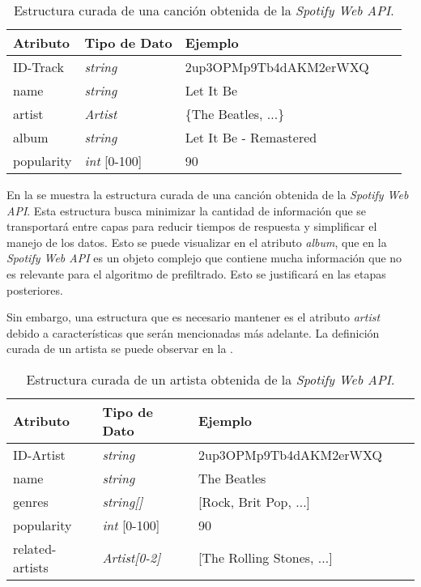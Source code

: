 \begin{table}[h!]
\centering
\begin{tabular}{l l l l l}
\toprule
Atributo & Tipo de Dato & Ejemplo \\
\midrule
ID-Track & \textit{string} & 2up3OPMp9Tb4dAKM2erWXQ \\
name & \textit{string} & Let It Be \\
artist & \textit{Artist} & \{The Beatles, ...\} \\
album & \textit{string} & Let It Be - Remastered \\
popularity & \textit{int} [0-100] & 90 \\

\bottomrule
\end{tabular}
\caption{Estructura curada de una canción obtenida de la \textit{Spotify Web API}.}
\label{tab:canciones_api}
\end{table}

En la  se muestra la estructura curada de una canción obtenida de la \textit{Spotify Web API}. Esta estructura busca minimizar la cantidad de información que se transportará entre capas para reducir tiempos de respuesta y simplificar el manejo de los datos. Esto se puede visualizar en el atributo \textit{album}, que en la \textit{Spotify Web API} es un objeto complejo que contiene mucha información que no es relevante para el algoritmo de prefiltrado. Esto se justificará en las etapas posteriores.

Sin embargo, una estructura que es necesario mantener es el atributo \textit{artist} debido a características que serán mencionadas más adelante. La definición curada de un artista se puede observar en la .

\begin{table}[h!]
\centering
\begin{tabular}{l l l l l}
\toprule
Atributo & Tipo de Dato & Ejemplo \\
\midrule
ID-Artist & \textit{string} & 2up3OPMp9Tb4dAKM2erWXQ \\
name & \textit{string} & The Beatles \\
genres & \textit{string[]} & [Rock, Brit Pop, ...] \\
popularity & \textit{int} [0-100] & 90 \\
related-artists & \textit{Artist[0-2]} & [The Rolling Stones, ...] \\

\bottomrule
\end{tabular}
\caption{Estructura curada de un artista obtenida de la \textit{Spotify Web API}.}
\label{tab:artista_api}
\end{table}